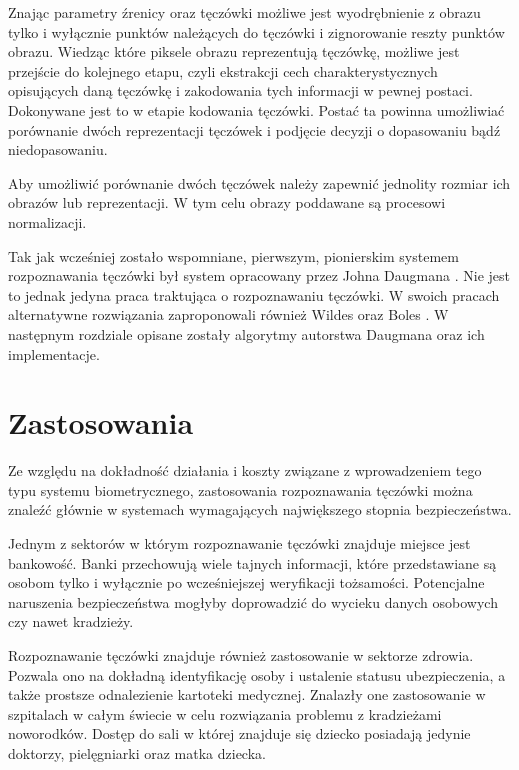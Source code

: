 Znając parametry \'zrenicy oraz tęczówki możliwe jest wyodrębnienie z obrazu tylko i wyłącznie
punktów należących do tęczówki i zignorowanie reszty punktów obrazu. Wiedząc które piksele obrazu
reprezentują tęczówkę, możliwe jest przejście do kolejnego etapu, czyli ekstrakcji cech charakterystycznych
opisujących daną tęczówkę i zakodowania tych informacji w pewnej postaci. Dokonywane jest to w etapie kodowania
tęczówki. Posta\'c ta powinna umożliwia\'c porównanie dwóch reprezentacji tęczówek i podjęcie decyzji o dopasowaniu
bąd\'z niedopasowaniu.

Aby umożliwi\'c porównanie dwóch tęczówek należy zapewni\'c jednolity rozmiar
ich obrazów lub reprezentacji. W tym celu obrazy poddawane są procesowi normalizacji.

Tak jak wcześniej zostało wspomniane, pierwszym, pionierskim systemem rozpoznawania tęczówki był
system opracowany przez Johna Daugmana \cite{DaugmanHowIrisRecognitionWorks}. Nie jest to jednak
jedyna praca traktująca o rozpoznawaniu tęczówki. W swoich pracach alternatywne rozwiązania
zaproponowali również Wildes \cite{Wildes} oraz Boles \cite{Boles}. W następnym rozdziale opisane
zostały algorytmy autorstwa Daugmana oraz ich implementacje.

\section{Zastosowania}

Ze względu na dokładnoś\'c działania i koszty związane z wprowadzeniem tego typu systemu
biometrycznego, zastosowania rozpoznawania tęczówki można znale\'z\'c głównie w systemach
wymagających największego stopnia bezpieczeństwa.

Jednym z sektorów w którym rozpoznawanie tęczówki znajduje miejsce jest bankowoś\'c. Banki
przechowują wiele tajnych informacji, które przedstawiane są osobom tylko i wyłącznie
po wcześniejszej weryfikacji tożsamości. Potencjalne naruszenia bezpieczeństwa mogłyby doprowadzi\'c
do wycieku danych osobowych czy nawet kradzieży.

Rozpoznawanie tęczówki znajduje również zastosowanie w sektorze zdrowia. Pozwala ono na dokładną
identyfikację osoby i ustalenie statusu ubezpieczenia, a także prostsze odnalezienie kartoteki
medycznej. Znalazły one zastosowanie w szpitalach w całym świecie w celu rozwiązania problemu z
kradzieżami noworodków. Dostęp do sali w której znajduje się dziecko posiadają jedynie doktorzy,
pielęgniarki oraz matka dziecka.

